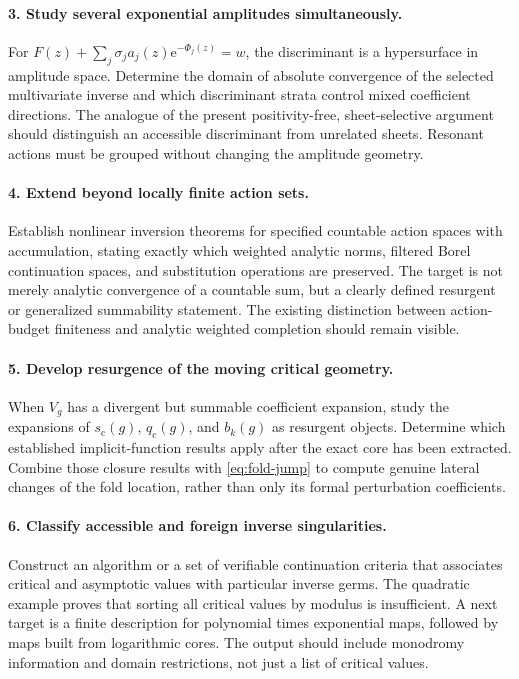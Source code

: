 \documentclass[11pt,a4paper]{article}
\numberwithin{equation}{section}
\theoremstyle{definition}
\theoremstyle{remark}
\newcommand{\e}{\mathrm e}
\begin{document}
\paragraph{3. Study several exponential amplitudes simultaneously.}
For $F(z)+\sum_j\sigma_j a_j(z)\e^{-\Phi_j(z)}=w$, the discriminant is a hypersurface in amplitude space. Determine the domain of absolute convergence of the selected multivariate inverse and which discriminant strata control mixed coefficient directions. The analogue of the present positivity-free, sheet-selective argument should distinguish an accessible discriminant from unrelated sheets. Resonant actions must be grouped without changing the amplitude geometry.

\paragraph{4. Extend beyond locally finite action sets.}
Establish nonlinear inversion theorems for specified countable action spaces with accumulation, stating exactly which weighted analytic norms, filtered Borel continuation spaces, and substitution operations are preserved. The target is not merely analytic convergence of a countable sum, but a clearly defined resurgent or generalized summability statement. The existing distinction between action-budget finiteness and analytic weighted completion should remain visible.

\paragraph{5. Develop resurgence of the moving critical geometry.}
When $V_g$ has a divergent but summable coefficient expansion, study the expansions of $s_{\mathrm c}(g)$, $q_{\mathrm c}(g)$, and $b_k(g)$ as resurgent objects. Determine which established implicit-function results apply after the exact core has been extracted. Combine those closure results with \eqref{eq:fold-jump} to compute genuine lateral changes of the fold location, rather than only its formal perturbation coefficients.

\paragraph{6. Classify accessible and foreign inverse singularities.}
Construct an algorithm or a set of verifiable continuation criteria that associates critical and asymptotic values with particular inverse germs. The quadratic example proves that sorting all critical values by modulus is insufficient. A next target is a finite description for polynomial times exponential maps, followed by maps built from logarithmic cores. The output should include monodromy information and domain restrictions, not just a list of critical values.
\end{document}
